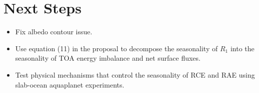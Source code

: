 \documentclass[11pt]{article}
\begin{document}
\section{Next Steps}
\label{sec:orgb162501}
\begin{itemize}
\item Fix albedo contour issue.
\item Use equation (11) in the proposal to decompose the seasonality of \(R_1\) into the seasonality of TOA energy imbalance and net surface fluxes.
\item Test physical mechanisms that control the seasonality of RCE and RAE using slab-ocean aquaplanet experiments.
\end{itemize}



\end{document}
